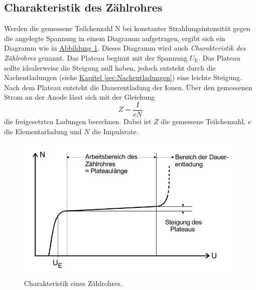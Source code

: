 \subsection{Charakteristik des Zählrohres}
Werden die gemessene Teilchenzahl N bei konstanter Strahlungsintensität gegen die angelegte Spannung in einem
Diagramm aufgetragen, ergibt sich ein Diagramm wie in \hyperref[fig:Diagramm3]{Abbildung \ref{fig:Diagramm3}}.
Dieses Diagramm wird auch \textit{Charakteristik des Zählrohres} genannt.
Das Plateau beginnt mit der Spannung $U_\text{E}$.
Das Plateau sollte idealerweise die Steigung null haben, jedoch entsteht durch die Nachentladungen (siehe \hyperref[sec:Nachentladungen]{Kapitel \ref{sec:Nachentladungen}})
eine leichte Steigung. Nach dem Plateau entsteht die Dauerentladung der Ionen.
Über den gemessenen Strom an der Anode lässt sich mit der Gleichung
\begin{equation} \label{eq:ladungen}
Z = \frac{I}{e N}
\end{equation}
die freigesetzten Ladungen berechnen. Dabei ist $Z$ die gemessene Teilchenzahl, $e$ die Elementarladung und $N$ die Impulsrate.
\begin{figure}
    \center
    \includegraphics[width=0.7\linewidth]{pictures/Diagramm3.pdf}
    \caption{Charakteristik eines Zählrohres.}\label{fig:Diagramm3}
\end{figure}
